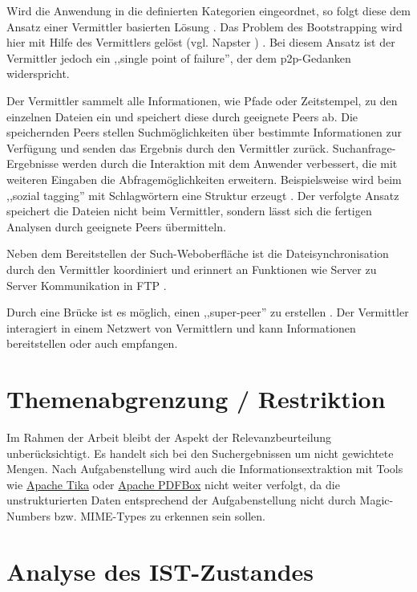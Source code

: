 \documentclass[oneside, ngerman, toc=bibliography,bibliography=totoc,listof=entryprefix, open=right,numbers=noenddot,fontsize=12pt]{scrbook}
\begin{document}
Wird die Anwendung in die definierten Kategorien eingeordnet, so folgt diese dem Ansatz einer Vermittler basierten Lösung \cite{backx2002comparison}. Das Problem des Bootstrapping wird hier mit Hilfe des Vermittlers gelöst (vgl. { Napster} \cite{mahlmann2007peer}) \cite{4144906}. Bei diesem Ansatz ist der Vermittler jedoch ein ,,single point of failure'', der dem \acrshort{p2p}-Gedanken widerspricht. 

Der Vermittler sammelt alle Informationen, wie Pfade oder Zeitstempel, zu den einzelnen Dateien ein und speichert diese durch geeignete Peers ab. Die speichernden Peers stellen Suchmöglichkeiten über bestimmte Informationen zur Verfügung und senden das Ergebnis durch den Vermittler zurück.
Suchanfrage-Ergebnisse werden durch die Interaktion mit dem Anwender verbessert, die mit weiteren Eingaben die Abfragemöglichkeiten erweitern.
Beispielsweise wird beim ,,sozial tagging'' mit Schlagwörtern eine Struktur erzeugt \cite{gaiser2008good}.
Der verfolgte Ansatz speichert die Dateien nicht beim Vermittler, sondern lässt sich die fertigen Analysen durch geeignete Peers übermitteln.

Neben dem Bereitstellen der Such-Weboberfläche ist die Dateisynchronisation durch den Vermittler koordiniert und erinnert an Funktionen wie Server zu Server Kommunikation in FTP \cite{rfc959}.

Durch eine Brücke ist es möglich, einen ,,super-peer'' zu erstellen \cite{yang2003designing}. Der Vermittler interagiert in einem Netzwert von Vermittlern und kann Informationen bereitstellen oder auch empfangen.

\section{Themenabgrenzung / Restriktion}
Im Rahmen der Arbeit bleibt der Aspekt der Relevanzbeurteilung unberücksichtigt. Es handelt sich bei den Suchergebnissen um nicht gewichtete Mengen. Nach Aufgabenstellung wird auch die Informationsextraktion mit Tools wie \href{http://tika.apache.org/}{Apache Tika} oder  \href{http://pdfbox.apache.org/}{Apache PDFBox} nicht weiter verfolgt, da die unstrukturierten Daten entsprechend der Aufgabenstellung nicht durch {Magic-Numbers bzw. MIME-Types} zu erkennen sein sollen. 


\section{Analyse des IST-Zustandes}\label{sec:ist}
\end{document}
